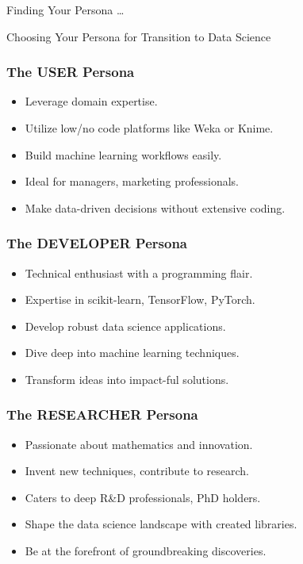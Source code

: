 \begin{frame}[fragile]\frametitle{}
	
	\begin{center}
	{\Large Finding Your Persona \ldots

	Choosing Your Persona for Transition to Data Science}  
	\end{center}

\end{frame}



\begin{frame}[fragile]\frametitle{The USER Persona}
        \begin{itemize}
            \item Leverage domain expertise.
            \item Utilize low/no code platforms like Weka or Knime.
            \item Build machine learning workflows easily.
            \item Ideal for managers, marketing professionals.
            \item Make data-driven decisions without extensive coding.
        \end{itemize}
\end{frame}

\begin{frame}[fragile]\frametitle{The DEVELOPER  Persona}
        \begin{itemize}
            \item Technical enthusiast with a programming flair.
            \item Expertise in scikit-learn, TensorFlow, PyTorch.
            \item Develop robust data science applications.
            \item Dive deep into machine learning techniques.
            \item Transform ideas into impact-ful solutions.
        \end{itemize}
\end{frame}

\begin{frame}[fragile]\frametitle{The RESEARCHER   Persona}
        \begin{itemize}
            \item Passionate about mathematics and innovation.
            \item Invent new techniques, contribute to research.
            \item Caters to deep R\&D professionals, PhD holders.
            \item Shape the data science landscape with created libraries.
            \item Be at the forefront of groundbreaking discoveries.
        \end{itemize}
\end{frame}

